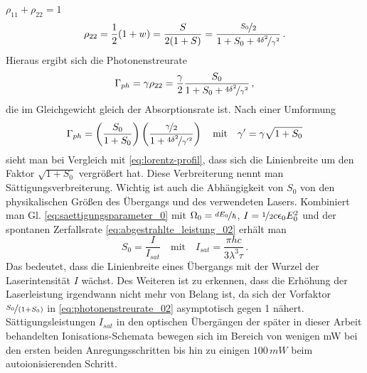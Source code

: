 $\rho_{11}+\rho_{22}=1$
\begin{equation}\label{eq:besetzung_22}
	\rho_{22}=\frac{1}{2}(1+w)=\frac{S}{2(1+S)}=\frac{\nicefrac{S_0}{2}}{1+S_0+\nicefrac{4\delta^2}{\gamma^2}}\,.
\end{equation}
Hieraus ergibt sich die Photonenstreurate
\begin{equation}\label{eq:photonenstreurate_01}
	\Gamma_{ph}=\gamma\rho_{22}=\frac{\gamma}{2}\frac{S_0}{1+S_0+\nicefrac{4\delta^2}{\gamma^2}}\,,
\end{equation}
die im Gleichgewicht gleich der Absorptionsrate ist.
Nach einer Umformung
\begin{equation}\label{eq:photonenstreurate_02}
	\Gamma_{ph}=\left(\frac{S_0}{1+S_0}\right)\left(\frac{\nicefrac{\gamma}{2}}{1+\nicefrac{4\delta^2}{\gamma'^2}}\right)
	\quad\text{mit}\quad
	\gamma'=\gamma\sqrt{1+S_0}
\end{equation}
sieht man bei Vergleich mit \eqref{eq:lorentz-profil}, dass sich die
Linienbreite um den Faktor $\sqrt{1+S_0}$ vergrößert hat. Diese Verbreiterung
nennt man Sättigungsverbreiterung. Wichtig ist auch die Abhängigkeit von $S_0$
von den physikalischen Größen des Übergangs und des verwendeten Lasers.
Kombiniert man Gl. \eqref{eq:saettigungsparameter_0} mit
$\Omega_0=\nicefrac{dE_0}{\hbar}$, $I=\nicefrac{1}{2}c\epsilon_0E_0^2$ und der
spontanen Zerfallsrate \eqref{eq:abgestrahlte_leistung_02} erhält man
\begin{equation}\label{eq:saettigungsparameter_physikalische_groessen}
		S_0=\frac{I}{I_{sat}}
		\quad\text{mit}\quad
		I_{sat}=\frac{\pi hc}{3\lambda^3\tau}\,.
\end{equation}
Das bedeutet, dass die Linienbreite eines Übergangs mit der Wurzel der
Laserintensität $I$ wächst. Des Weiteren
ist zu erkennen, dass die Erhöhung der Laserleistung irgendwann nicht mehr
von Belang ist, da sich der Vorfaktor $\nicefrac{S_0}{\left(1+S_0\right)}$ in
\eqref{eq:photonenstreurate_02} asymptotisch gegen 1 nähert.
Sättigungsleistungen $I_{sat}$ in den optischen Übergängen der später in dieser
Arbeit behandelten Ionisations-Schemata bewegen sich im Bereich von wenigen
mW bei den ersten beiden Anregungsschritten bis hin zu einigen
$100\,mW$ beim autoionisierenden Schritt.

